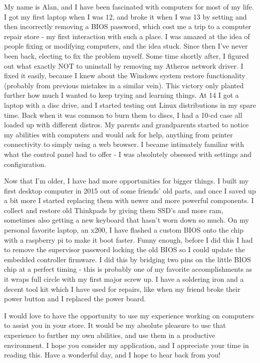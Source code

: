 \documentclass[12pt]{article}
\begin{document}
\pagestyle{empty} %


My name is Alan, and I have been fascinated with computers for most of my life.
I got my first laptop when I was 12, and broke it when I was 13 by setting and
then incorrectly removing a BIOS password, which cost me a trip to a computer
repair store - my first interaction with such a place. I was amazed at the idea
of people fixing or modifying computers, and the idea stuck. Since then I've
never been back, electing to fix the problem myself. Some time shortly after, I
figured out what exactly NOT to uninstall by removing my Atheros network
driver. I fixed it easily, because I knew about the Windows system restore
functionality (probably from previous mistakes in a similar vein). This victory
only planted further how much I wanted to keep trying and learning things. At
14 I got a laptop with a disc drive, and I started testing out Linux
distributions in my spare time. Back when it was common to burn them to discs,
I had a 10-cd case all loaded up with different distros. My parents and
grandparents started to notice my abilities with computers and would ask for
help, anything from printer connectivity to simply using a web browser. I
became intimately familiar with what the control panel had to offer - I was
absolutely obsessed with settings and configuration.

\medskip

Now that I'm older, I have had more opportunities for bigger things. I built my
first desktop computer in 2015 out of some friends' old parts, and once I saved
up a bit more I started replacing them with newer and more powerful components.
I collect and restore old Thinkpads by giving them SSD's and more ram,
sometimes also getting a new keyboard that hasn't worn down so much. On my
personal favorite laptop, an x200, I have flashed a custom BIOS onto the chip
with a raspberry pi to make it boot faster. Funny enough, before I did this I
had to remove the supervisor password locking the old BIOS so I could update
the embedded controller firmware. I did this by bridging two pins on the little
BIOS chip at a perfect timing - this is probably one of my favorite
accomplishments as it wraps full circle with my first major screw up. I have a
soldering iron and a decent tool kit which I have used for repairs, like when
my friend broke their power button and I replaced the power board.

\medskip

I would love to have the opportunity to use my experience working on computers
to assist you in your store. It would be my absolute pleasure to use that
experience to further my own abilities, and use them in a productive
environment. I hope you consider my application, and I appreciate your time in
reading this. Have a wonderful day, and I hope to hear back from you!
\end{document}
